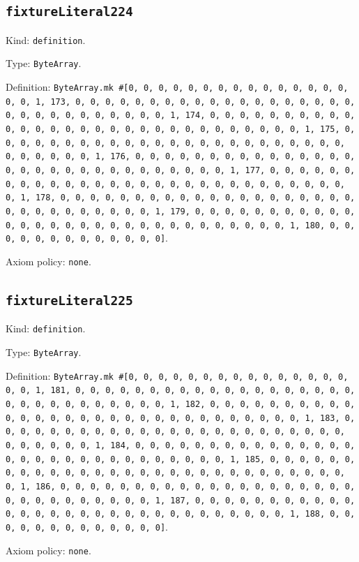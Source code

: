 \documentclass[11pt]{article}
\begin{document}
\subsection*{\texttt{fixtureLiteral224}}
\noindent Kind: \texttt{definition}.\par
\noindent Type: \texttt{ByteArray}.\par
\noindent Definition: \texttt{ByteArray.mk \#[0, 0, 0, 0, 0, 0, 0, 0, 0, 0, 0, 0, 0, 0, 0, 0, 0, 1, 173, 0, 0, 0, 0, 0, 0, 0, 0, 0, 0, 0, 0, 0, 0, 0, 0, 0, 0, 0, 0, 0, 0, 0, 0, 0, 0, 0, 0, 0, 0, 1, 174, 0, 0, 0, 0, 0, 0, 0, 0, 0, 0, 0, 0, 0, 0, 0, 0, 0, 0, 0, 0, 0, 0, 0, 0, 0, 0, 0, 0, 0, 0, 1, 175, 0, 0, 0, 0, 0, 0, 0, 0, 0, 0, 0, 0, 0, 0, 0, 0, 0, 0, 0, 0, 0, 0, 0, 0, 0, 0, 0, 0, 0, 0, 1, 176, 0, 0, 0, 0, 0, 0, 0, 0, 0, 0, 0, 0, 0, 0, 0, 0, 0, 0, 0, 0, 0, 0, 0, 0, 0, 0, 0, 0, 0, 0, 1, 177, 0, 0, 0, 0, 0, 0, 0, 0, 0, 0, 0, 0, 0, 0, 0, 0, 0, 0, 0, 0, 0, 0, 0, 0, 0, 0, 0, 0, 0, 0, 1, 178, 0, 0, 0, 0, 0, 0, 0, 0, 0, 0, 0, 0, 0, 0, 0, 0, 0, 0, 0, 0, 0, 0, 0, 0, 0, 0, 0, 0, 0, 0, 1, 179, 0, 0, 0, 0, 0, 0, 0, 0, 0, 0, 0, 0, 0, 0, 0, 0, 0, 0, 0, 0, 0, 0, 0, 0, 0, 0, 0, 0, 0, 0, 1, 180, 0, 0, 0, 0, 0, 0, 0, 0, 0, 0, 0, 0, 0]}.\par
\noindent Axiom policy: \texttt{none}.\par
\subsection*{\texttt{fixtureLiteral225}}
\noindent Kind: \texttt{definition}.\par
\noindent Type: \texttt{ByteArray}.\par
\noindent Definition: \texttt{ByteArray.mk \#[0, 0, 0, 0, 0, 0, 0, 0, 0, 0, 0, 0, 0, 0, 0, 0, 0, 1, 181, 0, 0, 0, 0, 0, 0, 0, 0, 0, 0, 0, 0, 0, 0, 0, 0, 0, 0, 0, 0, 0, 0, 0, 0, 0, 0, 0, 0, 0, 0, 1, 182, 0, 0, 0, 0, 0, 0, 0, 0, 0, 0, 0, 0, 0, 0, 0, 0, 0, 0, 0, 0, 0, 0, 0, 0, 0, 0, 0, 0, 0, 0, 1, 183, 0, 0, 0, 0, 0, 0, 0, 0, 0, 0, 0, 0, 0, 0, 0, 0, 0, 0, 0, 0, 0, 0, 0, 0, 0, 0, 0, 0, 0, 0, 1, 184, 0, 0, 0, 0, 0, 0, 0, 0, 0, 0, 0, 0, 0, 0, 0, 0, 0, 0, 0, 0, 0, 0, 0, 0, 0, 0, 0, 0, 0, 0, 1, 185, 0, 0, 0, 0, 0, 0, 0, 0, 0, 0, 0, 0, 0, 0, 0, 0, 0, 0, 0, 0, 0, 0, 0, 0, 0, 0, 0, 0, 0, 0, 1, 186, 0, 0, 0, 0, 0, 0, 0, 0, 0, 0, 0, 0, 0, 0, 0, 0, 0, 0, 0, 0, 0, 0, 0, 0, 0, 0, 0, 0, 0, 0, 1, 187, 0, 0, 0, 0, 0, 0, 0, 0, 0, 0, 0, 0, 0, 0, 0, 0, 0, 0, 0, 0, 0, 0, 0, 0, 0, 0, 0, 0, 0, 0, 1, 188, 0, 0, 0, 0, 0, 0, 0, 0, 0, 0, 0, 0, 0]}.\par
\noindent Axiom policy: \texttt{none}.\par
\end{document}
